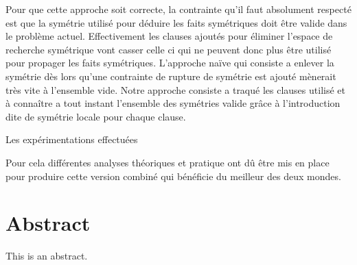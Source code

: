 Pour que cette approche soit correcte, la contrainte qu'il faut absolument respecté est que la symétrie utilisé pour déduire les
faits symétriques doit être valide dans le problème actuel. Effectivement les clauses ajoutés pour éliminer l'espace de recherche
symétrique vont casser celle ci qui ne peuvent donc plus être utilisé pour propager les faits symétriques.
L'approche naïve qui consiste a enlever la symétrie dès lors qu'une contrainte de rupture de symétrie est ajouté mènerait très vite
à l'ensemble vide. Notre approche consiste a traqué les clauses utilisé et à connaître a tout instant l'ensemble des symétries
valide grâce à l'introduction dite de symétrie locale pour chaque clause.

Les expérimentations effectuées 


Pour cela différentes analyses théoriques et pratique ont dû être mis en place pour produire cette version
combiné qui bénéficie du meilleur des deux mondes.

\chapter*{Abstract}

This is an abstract.